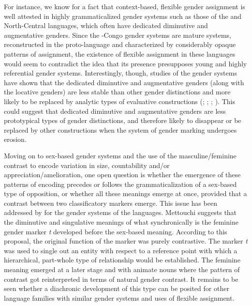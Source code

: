 \documentclass[output=collectionpaper]{langsci/langscibook}
\begin{document}
For instance, we know for a fact that context-based, flexible gender assignment is well attested in highly grammaticalized gender systems such as those of the  and North-Central  languages, which often have dedicated diminutive and augmentative genders. Since the -Congo gender systems are mature systems, reconstructed in the proto-language and characterized by considerably opaque patterns of assignment, the existence of flexible assignment in these languages would seem to contradict the idea that its presence presupposes young and highly referential gender systems. Interestingly, though, studies of the  gender systems have shown that the dedicated diminutive and augmentative genders (along with the locative genders) are less stable than other gender distinctions and more likely to be replaced by analytic types of evaluative constructions (\citealt{Creissels1999}; \citealt{Gueldemann1999}; \citealt{DiGarbo2014}; \citealt{Verkerk2014}). This could suggest that dedicated diminutive and augmentative genders are less prototypical types of gender distinctions, and therefore likely to disappear or be replaced by other constructions when the system of gender marking undergoes erosion.

Moving on to sex-based gender systems and the use of the masculine/feminine contrast to encode variation in size, countability and/or appreciation/amelioration, one open question is whether the emergence of these patterns of encoding precedes or follows the grammaticalization of a sex-based type of opposition, or whether all these meanings emerge at once, provided that a contrast between two classificatory markers emerge. This issue has been addressed by \cite{Mettouchi2000} for the gender systems of the  languages. Mettouchi suggests that the diminutive and singulative meanings of what synchronically is the feminine gender marker \textit{t} developed before the sex-based meaning. According to this proposal, the original function of the marker was purely contrastive. The marker \textit{t} was used to single out an entity with respect to a reference point with which a hierarchical, part-whole type of relationship would be established. The feminine meaning emerged at a later stage and with animate nouns where the pattern of contrast got reinterpreted in terms of natural gender contrast. It remains to be seen whether a diachronic development of this type can be posited for other language families with similar gender systems and uses of flexible assignment.
\end{document}
